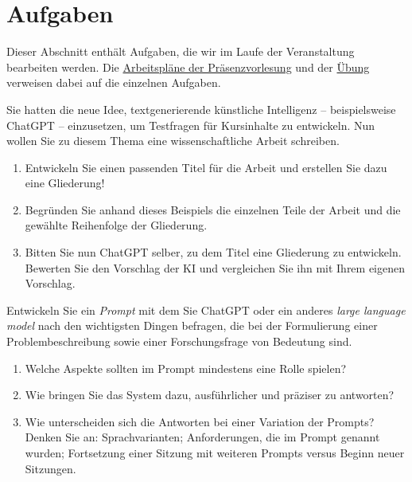 \documentclass[a4paper]{article}%
\begin{document}
\clearpage




\section{Aufgaben} \hypertarget{Aufgaben}{}\label{auf}

Dieser Abschnitt enthält Aufgaben, die wir im Laufe der Veranstaltung
bearbeiten werden. 
Die \hyperref[Prsenzvorlesung]{Arbeitspläne der Präsenzvorlesung} und der \hyperref[Ubung]{Übung}
verweisen dabei auf die einzelnen Aufgaben.



Sie hatten die neue Idee, textgenerierende künstliche Intelligenz -- beispielsweise ChatGPT -- 
einzusetzen,
um Testfragen für Kursinhalte zu entwickeln.
Nun wollen Sie zu diesem Thema eine wissenschaftliche Arbeit schreiben.

\begin{enumerate}
\item Entwickeln Sie einen passenden Titel für die Arbeit und
erstellen Sie dazu eine Gliederung!
\item Begründen Sie anhand dieses Beispiels die einzelnen Teile der Arbeit
und die gewählte Reihenfolge der Gliederung.
\item Bitten Sie nun ChatGPT selber, zu dem Titel eine Gliederung zu entwickeln.
Bewerten Sie den Vorschlag der KI und vergleichen Sie ihn mit Ihrem eigenen Vorschlag.
\end{enumerate}




Entwickeln Sie ein \textit{Prompt} mit dem Sie ChatGPT oder ein
anderes \textit{large language model} nach den
wichtigsten Dingen befragen, die  bei der Formulierung einer Problembeschreibung
sowie einer Forschungsfrage 
von Bedeutung sind.

\begin{enumerate}
\item Welche Aspekte sollten im Prompt mindestens eine Rolle spielen?
\item Wie bringen Sie das System dazu, ausführlicher und präziser zu antworten?
\item Wie unterscheiden sich die Antworten bei einer Variation der Prompts?
Denken Sie an: Sprachvarianten; Anforderungen, die im Prompt genannt wurden;
 Fortsetzung einer Sitzung mit weiteren Prompts versus Beginn neuer Sitzungen.
\end{enumerate}
\end{document}
